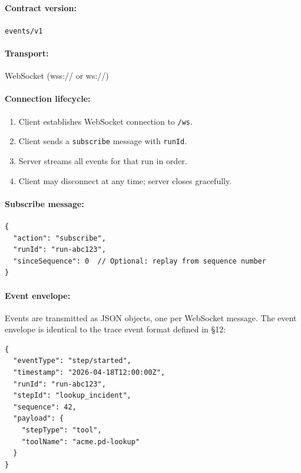 \paragraph{Contract version:} \texttt{events/v1}

\paragraph{Transport:} WebSocket (wss:// or ws://)

\paragraph{Connection lifecycle:}

\begin{enumerate}
  \item Client establishes WebSocket connection to \texttt{/ws}.
  \item Client sends a \texttt{subscribe} message with \texttt{runId}.
  \item Server streams all events for that run in order.
  \item Client may disconnect at any time; server closes gracefully.
\end{enumerate}

\paragraph{Subscribe message:}

\begin{verbatim}
{
  "action": "subscribe",
  "runId": "run-abc123",
  "sinceSequence": 0  // Optional: replay from sequence number
}
\end{verbatim}

\paragraph{Event envelope:}

Events are transmitted as JSON objects, one per WebSocket message.  The event
envelope is identical to the trace event format defined in §12:

\begin{verbatim}
{
  "eventType": "step/started",
  "timestamp": "2026-04-18T12:00:00Z",
  "runId": "run-abc123",
  "stepId": "lookup_incident",
  "sequence": 42,
  "payload": {
    "stepType": "tool",
    "toolName": "acme.pd-lookup"
  }
}
\end{verbatim}

